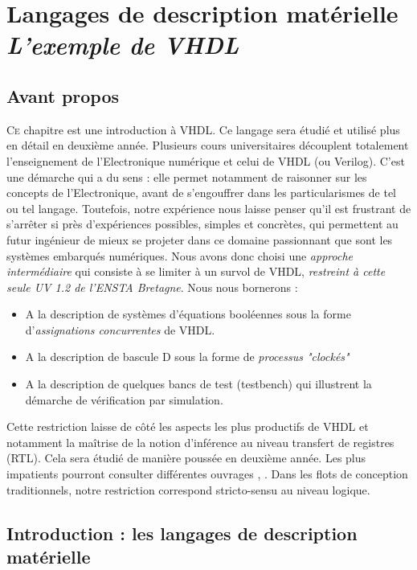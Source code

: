 \chapter[VHDL]{Langages de description matérielle\\{\it L'exemple de VHDL}}
\minitoc

\section{Avant propos}
\lettrine{C}e chapitre est une introduction à VHDL. Ce langage sera étudié et utilisé plus en détail en deuxième année. Plusieurs
cours universitaires découplent totalement l'enseignement de l'Electronique numérique et celui de VHDL (ou Verilog). C'est une
démarche qui a du sens : elle permet notamment de raisonner sur les concepts de l'Electronique, avant de s'engouffrer dans les
particularismes de tel ou tel langage. Toutefois, notre expérience nous laisse penser qu'il est frustrant de s'arrêter si près
d'expériences possibles, simples et concrètes, qui permettent au futur ingénieur de mieux se projeter dans ce domaine passionnant
que sont les systèmes embarqués numériques. Nous avons donc choisi une {\it approche intermédiaire} qui consiste à se limiter à un survol
de VHDL, {\it restreint à cette seule UV 1.2 de l'ENSTA Bretagne}. Nous nous bornerons :

\begin{itemize}
  \item A la description de systèmes d'équations booléennes sous la forme d'{\it assignations concurrentes} de VHDL.
  \item A la description de bascule D sous la forme de {\it processus "clockés"}
  \item A la description de quelques bancs de test (testbench) qui illustrent la démarche de vérification par simulation.
\end{itemize}

Cette restriction laisse de côté les aspects les plus productifs de VHDL et notamment la maîtrise de la notion d'inférence au niveau transfert
de registres (RTL). Cela sera étudié de manière poussée en deuxième année. Les plus impatients pourront consulter différentes ouvrages \cite{Chu2006}, \cite{Chu2008}.
Dans les flots de conception traditionnels, notre restriction correspond stricto-sensu au niveau logique.

\section{Introduction : les langages de description matérielle}

